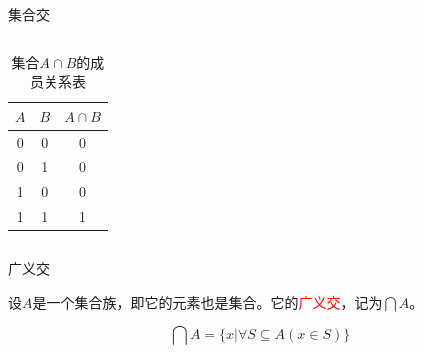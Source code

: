 \documentclass[xetex,10pt,aspectratio=43]{beamer}
\begin{document}
\begin{frame}{集合交}
\begin{columns}
\begin{column}
\begin{table}
					\centering
					
					\begin{tabular}{|c|c|c|}
						\hline
						$A$ & $B$ & $A\cap B$\\
						\hline
						0 & 0 & 0\\
						\hline
						0 & 1 & 0\\
						\hline
						1 & 0 & 0\\
						\hline
						1 & 1 & 1\\
						\hline
					\end{tabular}
					
					\caption{集合$A\cap B$的成员关系表}
				
				\end{table}
			
			\end{column}
		
		\end{columns}
			
	\end{frame}

	\begin{frame}{广义交}
		
		设$A$是一个集合族，即它的元素也是集合。它的\textcolor{red}{广义交}，记为$\bigcap A$。
		
		$$\bigcap A=\{x|\forall S\subseteq A(x\in S)\}$$
		
	\end{frame}
\end{document}
